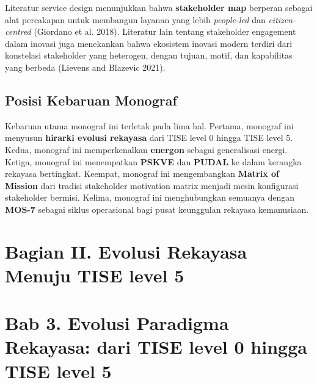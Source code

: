 \documentclass[
  letterpaper,
  DIV=11,
  numbers=noendperiod]{scrreprt}
\begin{document}

Literatur service design menunjukkan bahwa \textbf{stakeholder map}
berperan sebagai alat percakapan untuk membangun layanan yang lebih
\emph{people-led} dan \emph{citizen-centred} (Giordano et al. 2018).
Literatur lain tentang stakeholder engagement dalam inovasi juga
menekankan bahwa ekosistem inovasi modern terdiri dari konstelasi
stakeholder yang heterogen, dengan tujuan, motif, dan kapabilitas yang
berbeda (Lievens and Blazevic 2021).

\section*{Posisi Kebaruan Monograf}\label{posisi-kebaruan-monograf}


Kebaruan utama monograf ini terletak pada lima hal. Pertama, monograf
ini menyusun \textbf{hirarki evolusi rekayasa} dari TISE level 0 hingga
TISE level 5. Kedua, monograf ini memperkenalkan \textbf{energon}
sebagai generalisasi energi. Ketiga, monograf ini menempatkan
\textbf{PSKVE} dan \textbf{PUDAL} ke dalam kerangka rekayasa bertingkat.
Keempat, monograf ini mengembangkan \textbf{Matrix of Mission} dari
tradisi stakeholder motivation matrix menjadi mesin konfigurasi
stakeholder bermisi. Kelima, monograf ini menghubungkan semuanya dengan
\textbf{MOS-7} sebagai siklus operasional bagi pusat keunggulan rekayasa
kemanusiaan.


\chapter*{Bagian II. Evolusi Rekayasa Menuju TISE level
5}\label{bagian-ii.-evolusi-rekayasa-menuju-tise-level-5}



\chapter*{Bab 3. Evolusi Paradigma Rekayasa: dari TISE level 0 hingga
TISE level
5}\label{bab-3.-evolusi-paradigma-rekayasa-dari-tise-level-0-hingga-tise-level-5}
\end{document}
